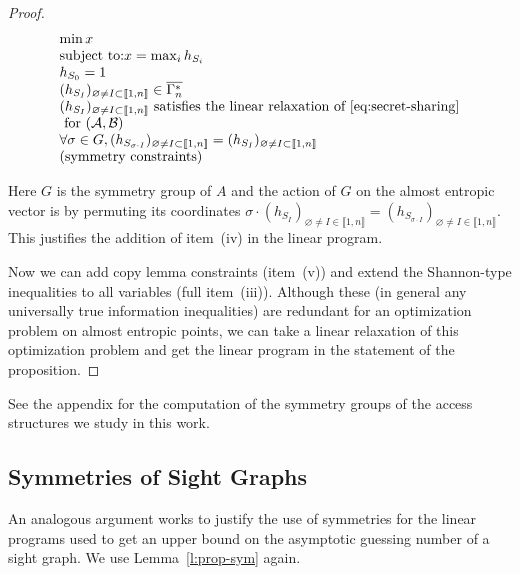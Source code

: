 \documentclass[11pt, a4paper]{kybernetika}
\begin{document}
\begin{proof}
		$$
		\begin{array}{l}
			\min x\\
			\text{subject to:}
			x=\max_ih_{S_i}\\
			h_{S_0}=1\\
			(h_{S_I})_{\varnothing\neq I\subset\llbracket1,n\rrbracket}\in\overline{\Gamma_n^*}\\
			(h_{S_I})_{\varnothing\neq I\subset\llbracket1,n\rrbracket}\text{ satisfies the linear relaxation of }\ref{eq:secret-sharing}\\
			\text{ for }(\mathcal{A},\mathcal{B})\\
			\forall\sigma\in G, (h_{S_{\sigma\cdot I}})_{\varnothing\neq I\subset\llbracket1,n\rrbracket}=(h_{S_I})_{\varnothing\neq I\subset\llbracket1,n\rrbracket}\\
			\text{(symmetry constraints)}
		\end{array}
		$$
		
		Here $G$ is the symmetry group of $A$ and the action of $G$ on the almost entropic vector is by permuting its coordinates $\sigma\cdot(h_{S_I})_{\varnothing\neq I\in\llbracket1,n\rrbracket}=(h_{S_{\sigma\cdot I}})_{\varnothing\neq I\in\llbracket1,n\rrbracket}$. This justifies the addition of item~(iv) in the linear program.
		
		Now we can add copy lemma constraints (item~(v)) and extend the Shannon-type inequalities to all variables (full item~(iii)). Although these (in general any universally true information inequalities) are redundant for an optimization problem on almost entropic points, we can take a linear relaxation of this optimization problem and get the linear program in the statement of the proposition.
		
	\end{proof}
	
	See the appendix for the computation of the symmetry groups of the access structures we study in this work.
	
	\subsection{Symmetries of Sight Graphs}
	
	An analogous argument works to justify the use of symmetries for the linear programs used to get an upper bound on the asymptotic guessing number of a sight graph. We use Lemma~\ref{l:prop-sym} again.
	
\end{document}
